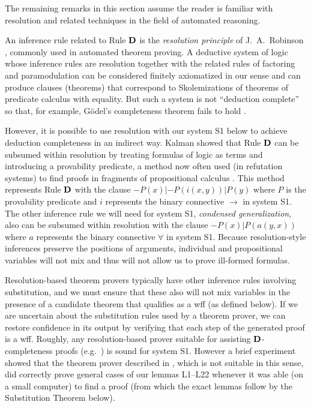 \documentclass[leqno]{article}
\begin{document}
     The remaining remarks in this section assume the reader is familiar with
resolution and related techniques in the field of automated reasoning.

     An inference rule related to Rule ${\bf D}$ is the {\em resolution
principle} of J.~A.~Robinson \cite{Robinson}, commonly used in automated
theorem proving.  A deductive system of logic whose inference rules
are resolution together with the related rules of factoring and paramodulation
can be considered finitely axiomatized in our sense and can produce clauses
(theorems) that correspond to Skolemizations of theorems of predicate calculus
with equality.  But such a system is not ``deduction complete'' so that, for
example, G\"{o}del's completeness theorem fails to hold \cite{WosR}.

     However, it is possible to use resolution with our system S1 below to
achieve deduction completeness in an indirect way.  Kalman \cite{Kalman}
showed that Rule ${\bf D}$ can be subsumed within resolution by treating
formulas of logic as terms and introducing a provability predicate, a method
now often used (in refutation systems) to find proofs in fragments of
propositional calculus \cite[pp.\ 355 and 480--482]{Wos}.  This method
represents Rule ${\bf D}$ with the clause $-P(x) | -P(i(x,y)) | P(y)$ where
$P$ is the provability predicate and $i$ represents the binary connective
$\rightarrow$ in system S1.  The other inference rule we will need for system
S1, {\em condensed generalization}, also can be subsumed within resolution
with the clause $-P(x) | P(a(y,x))$ where $a$ represents the binary connective
$\forall$ in system S1.  Because resolution-style inferences preserve the
positions of arguments, individual and propositional variables will not mix
and thus will not allow us to prove ill-formed formulas.

     Resolution-based theorem provers typically have other inference rules
involving substitution, and we must ensure that these also will not mix
variables in the presence of a candidate theorem that qualifies as a wff (as
defined below).  If we are uncertain about the substitution rules used by a
theorem prover, we can restore confidence in its output by verifying that each
step of the generated proof is a wff.  Roughly, any resolution-based prover
suitable for assisting ${\bf D}$-completeness proofs (e.g.\ \cite{Mints}) is
sound for system S1.  However a brief experiment showed that the theorem
prover described in \cite{Wos}, which is not suitable in this sense, did
correctly prove general cases of our lemmas L1--L22 whenever it was able (on a
small computer) to find a proof (from which the exact lemmas follow by the
Substitution Theorem below).
\end{document}
